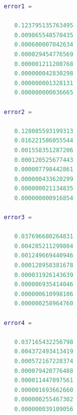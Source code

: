 \begin{lstlisting}[language = MATLAB]
error1 =

   0.123795135763495
   0.009865548570435
   0.000600007042634
   0.000029454776569
   0.000001211208768
   0.000000042830298
   0.000000001328131
   0.000000000036665

error2 =

   0.128085593199313
   0.016221586055544
   0.001558351287206
   0.000120525677443
   0.000007798442861
   0.000000433620299
   0.000000021134835
   0.000000000916854

error3 =

   0.037696680264831
   0.004285211299804
   0.001249669440946
   0.000128958381678
   0.000031926143639
   0.000006935414046
   0.000000610998106
   0.000000258964760

error4 =

   0.037165432256798
   0.004372493413419
   0.000572167228374
   0.000079420776488
   0.000011447097561
   0.000001693662660
   0.000000255467302
   0.000000039109056
\end{lstlisting}





